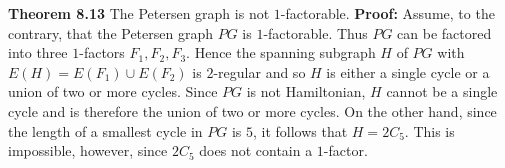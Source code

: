 \nopagenumbers
{\bf Theorem 8.13}
\vskip 6pt
The Petersen graph is not $1$-factorable.
\vskip 10pt
{\bf Proof:}
\vskip 6pt
Assume, to the contrary, that the Petersen graph $PG$ is $1$-factorable. Thus $PG$ can be factored into three $1$-factors $F_1,F_2,F_3$. Hence the spanning subgraph $H$ of $PG$ with $E(H)=E(F_1) \cup E(F_2)$ is $2$-regular and so $H$ is either a single cycle or a union of two or more cycles. Since $PG$ is not Hamiltonian, $H$ cannot be a single cycle and is therefore the union of two or more cycles. On the other hand, since the length of a smallest cycle in $PG$ is $5$, it follows that $H=2C_5$. This is impossible, however, since $2C_5$ does not contain a $1$-factor.

\vfill\eject
